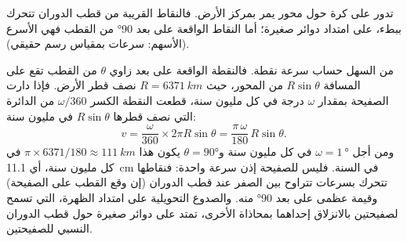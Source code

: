\begin{omfigure}

{\small تدور  على كرة حول محور يمر بمركز
الأرض. فالنقاط القريبة من قطب الدوران تتحرك ببطء، على امتداد دوائر صغيرة؛ أما
النقاط الواقعة على بعد \ang{90} من القطب فهي الأسرع (الأسهم: سرعات بمقياس رسم حقيقي).}
\end{omfigure}

من السهل حساب سرعة نقطة. فالنقطة الواقعة على بعد زاوي
$\theta$ من القطب تقع على المسافة $R\sin\theta$ من المحور، حيث
$R = \qty{6371}{km}$ نصف قطر الأرض. فإذا دارت الصفيحة بمقدار $\omega$
درجة في كل مليون سنة، قطعت النقطة الكسر $\omega/360$ من
الدائرة التي نصف قطرها $R\sin\theta$ في مليون سنة:
\[
  v = \frac{\omega}{360} \times 2\pi R\sin\theta
    = \frac{\pi\,\omega}{180}\,R\sin\theta .
\]
ومن أجل $\omega = \qty{1}{\degree}$ في كل مليون سنة و$\theta = \ang{90}$
يكون هذا $\pi \times 6371/180 \approx \qty{111}{km}$ في كل مليون سنة، أي
\qty{11.1}{cm} في السنة. فليس للصفيحة إذن سرعة واحدة: فنقاطها تتحرك
بسرعات تتراوح بين الصفر عند قطب الدوران (إن وقع القطب على
الصفيحة) وقيمة عظمى على بعد \ang{90} منه. والصدوع التحويلية على امتداد الظهرة،
التي تسمح لصفيحتين بالانزلاق إحداهما بمحاذاة الأخرى، تمتد على دوائر صغيرة حول
قطب الدوران النسبي للصفيحتين.

